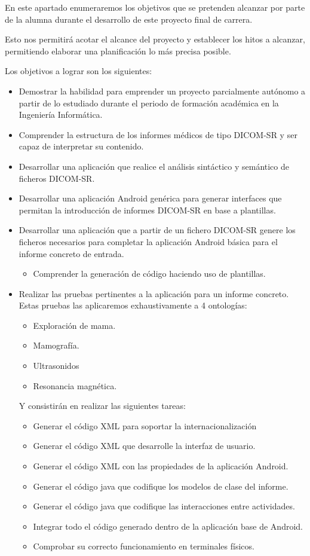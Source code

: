 
En este apartado enumeraremos los objetivos que se pretenden alcanzar por parte de la alumna durante el desarrollo de este proyecto final de carrera.\par
Esto nos permitirá acotar el alcance del proyecto y establecer los hitos a alcanzar, permitiendo elaborar una planificación lo más precisa posible.\medskip\par

Los objetivos a lograr son los siguientes:
\begin{itemize}
	\item Demostrar la habilidad para emprender un proyecto parcialmente autónomo a partir de lo estudiado durante el periodo de formación académica en la Ingeniería Informática.
	\item Comprender la estructura de los informes médicos de tipo DICOM-SR y ser capaz de interpretar su contenido.
	\item Desarrollar una aplicación que realice el análisis sintáctico y semántico de ficheros DICOM-SR.
	\item Desarrollar una aplicación Android genérica para generar interfaces que permitan la introducción de informes DICOM-SR en base a plantillas.
	\item Desarrollar una aplicación que a partir de un fichero DICOM-SR genere los ficheros necesarios para completar la aplicación Android básica para el informe concreto de entrada. 
	\begin{itemize}
		\item Comprender la generación de código haciendo uso de plantillas.
	\end{itemize}
	\item Realizar las pruebas pertinentes a la aplicación para un informe concreto. Estas pruebas las aplicaremos exhaustivamente a 4 ontologías:
	\begin{itemize}
		\item Exploración de mama.
		\item Mamografía.
		\item Ultrasonidos
		\item Resonancia magnética.
	\end{itemize}
	Y consistirán en realizar las siguientes tareas:
	\begin{itemize}
		\item Generar el código XML para soportar la internacionalización
		\item Generar el código XML que desarrolle la interfaz de usuario. 
		\item Generar el código XML con las propiedades de la aplicación Android.
		\item Generar el código java que codifique los modelos de clase del informe. 
		\item Generar el código java que codifique las interacciones entre actividades.
		\item Integrar todo el código generado dentro de la aplicación base de Android. 
		\item Comprobar su correcto funcionamiento en terminales físicos.
	\end{itemize}
\end{itemize}

